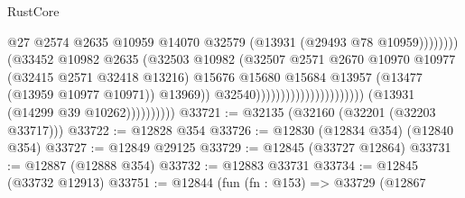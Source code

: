 \begin{lexlean}{RustCore}
\begin{coremodule}
                                                                          @27
                                                                          @2574
                                                                          @2635
                                                                          @10959
                                                                          @14070
                                                                          @32579
                                                                          (@13931
                                                                            (@29493
                                                                              @78
                                                                              @10959))))))))
                                                              (@33452
                                                                @10982
                                                                @2635
                                                                (@32503
                                                                  @10982
                                                                  (@32507
                                                                    @2571
                                                                    @2670
                                                                    @10970
                                                                    @10977
                                                                    (@32415 @2571 @32418 @13216)
                                                                    @15676
                                                                    @15680
                                                                    @15684
                                                                    @13957
                                                                    (@13477 (@13959 @10977 @10971))
                                                                    @13969))
                                                                @32540))))))))))))))))))))))
                    (@13931 (@14299 @39 @10262))))))))))
@33721 := @32135 (@32160 (@32201 (@32203 @33717)))
@33722 := @12828 @354
@33726 := @12830 (@12834 @354) (@12840 @354)
@33727 := @12849 @29125
@33729 := @12845 (@33727 @12864)
@33731 := @12887 (@12888 @354)
@33732 := @12883 @33731
@33734 := @12845 (@33732 @12913)
@33751 := @12844
    (fun (fn : @153) =>
    @33729
      (@12867

\end{coremodule}
\end{lexlean}
